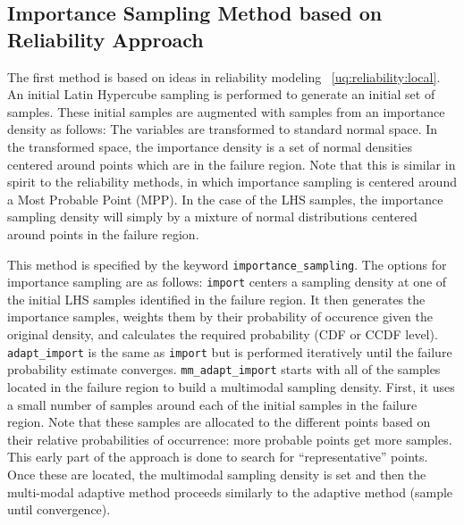 \subsection{Importance Sampling Method based on Reliability Approach}\label{uq:importance_rel}
The first method is based on ideas in reliability modeling ~\ref{uq:reliability:local}.
An initial Latin Hypercube sampling is performed to generate an initial set of samples.
These initial samples are augmented with samples from an importance density as follows:
The variables are transformed to standard normal space. In the transformed space,
the importance density is a set of normal densities centered around points which
are in the failure region. Note that this is similar in spirit to the reliability
methods, in which importance sampling is centered around a Most Probable Point (MPP).
In the case of the LHS samples, the importance sampling density will simply by
a mixture of normal distributions centered around points in the failure region.

This method is specified by the keyword \texttt{importance\_sampling}.
The options for importance sampling are as follows:  \texttt{import} 
centers a sampling
density at one of the initial LHS samples identified in the failure region.
It then generates the importance samples, weights them by their probability of occurence
given the original density, and calculates the required probability (CDF or CCDF level).
\texttt{adapt\_import} is the same as \texttt{import} but is performed iteratively until the
failure probability estimate converges.
\texttt{mm\_adapt\_import} starts with all of the samples located in the failure region
to build a multimodal sampling density. First, it uses a small number of samples around
each of the initial samples in the failure region. Note that these samples
are allocated to the different points based on their relative probabilities of occurrence:
more probable points get more samples. This early part of the approach is done to 
search for ``representative'' points. Once these are located, the multimodal sampling density is set and then the multi-modal adaptive method proceeds similarly to the 
adaptive method (sample until convergence).
 
